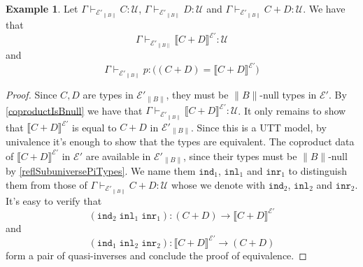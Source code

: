 \documentclass[12pt]{report}
\theoremstyle{definition}
\newtheorem{exmp}[thm]{Example}
\begin{document}
\begin{exmp}
Let $\Gamma \vdash_{\mathcal{E}'_{\lVert B \rVert}} C : \mathcal{U}$, $\Gamma \vdash_{\mathcal{E}'_{\lVert B \rVert}} D : \mathcal{U}$ and $\Gamma \vdash_{\mathcal{E}'_{\lVert B \rVert}} C +D : \mathcal{U}$. 
We have that
$$\Gamma \vdash_{\mathcal{E}'_{\lVert B \rVert}} \llbracket C + D\rrbracket^{\mathcal{E}'} : \mathcal{U}$$
and
$$\Gamma \vdash_{\mathcal{E}'_{\lVert B \rVert}} p : \big( (C +D) = \llbracket C + D\rrbracket^{\mathcal{E}'}\big)$$
\end{exmp}
\begin{proof}
Since $C, D$ are types in $\mathcal{E}'_{\lVert B \rVert}$, they must be $\lVert B \rVert$-null types in $\mathcal{E}'$. 
By \ref{coproductIsBnull} we have that $\Gamma \vdash_{\mathcal{E}'_{\lVert B \rVert}} \llbracket C + D\rrbracket^{\mathcal{E}'} : \mathcal{U}$. 
It only remains to show that $ \llbracket C + D\rrbracket^{\mathcal{E}'}$ is equal to $C+D$ in $\mathcal{E}'_{\lVert B \rVert}$. 
Since this is a UTT model, by univalence it's enough to show that the types are equivalent. 
The coproduct data of $ \llbracket C + D\rrbracket^{\mathcal{E}'}$ in $\mathcal{E}'$ are available in $\mathcal{E}'_{\lVert B \rVert}$, since their types must be $\lVert B \rVert$-null by \ref{reflSubuniversePiTypes}. 
We name them $\mathtt{ind}_1$, $\mathtt{inl}_1$ and $\mathtt{inr}_1$ to distinguish them from those of $\Gamma \vdash_{\mathcal{E}'_{\lVert B \rVert}} C +D : \mathcal{U}$ whose we denote with $\mathtt{ind}_2$, $\mathtt{inl}_2$ and $\mathtt{inr}_2$. 
It's easy to verify that 
$$(\mathtt{ind}_2\;\mathtt{inl}_1\;\mathtt{inr}_1) : (C+D) \rightarrow \llbracket C + D\rrbracket^{\mathcal{E}'}$$
and
$$(\mathtt{ind}_1\;\mathtt{inl}_2\;\mathtt{inr}_2) : \llbracket C + D\rrbracket^{\mathcal{E}'} \rightarrow (C+D)$$
form a pair of quasi-inverses and conclude the proof of equivalence. 
\end{proof}
\end{document}
